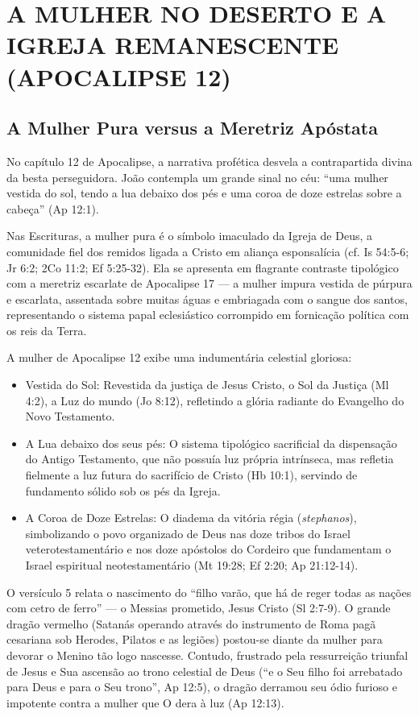 \section{A MULHER NO DESERTO E A IGREJA REMANESCENTE (APOCALIPSE 12)}



\subsection{A Mulher Pura versus a Meretriz Apóstata}


No capítulo 12 de Apocalipse, a narrativa profética desvela a contrapartida divina da besta perseguidora. João contempla um grande sinal no céu: ``uma mulher vestida do sol, tendo a lua debaixo dos pés e uma coroa de doze estrelas sobre a cabeça'' (Ap 12:1).

Nas Escrituras, a mulher pura é o símbolo imaculado da Igreja de Deus, a comunidade fiel dos remidos ligada a Cristo em aliança esponsalícia (cf. Is 54:5-6; Jr 6:2; 2Co 11:2; Ef 5:25-32). Ela se apresenta em flagrante contraste tipológico com a meretriz escarlate de Apocalipse 17 — a mulher impura vestida de púrpura e escarlata, assentada sobre muitas águas e embriagada com o sangue dos santos, representando o sistema papal eclesiástico corrompido em fornicação política com os reis da Terra.

A mulher de Apocalipse 12 exibe uma indumentária celestial gloriosa:
\begin{itemize}
  \item Vestida do Sol: Revestida da justiça de Jesus Cristo, o Sol da Justiça (Ml 4:2), a Luz do mundo (Jo 8:12), refletindo a glória radiante do Evangelho do Novo Testamento.
  \item A Lua debaixo dos seus pés: O sistema tipológico sacrificial da dispensação do Antigo Testamento, que não possuía luz própria intrínseca, mas refletia fielmente a luz futura do sacrifício de Cristo (Hb 10:1), servindo de fundamento sólido sob os pés da Igreja.
  \item A Coroa de Doze Estrelas: O diadema da vitória régia (\textit{stephanos}), simbolizando o povo organizado de Deus nas doze tribos do Israel veterotestamentário e nos doze apóstolos do Cordeiro que fundamentam o Israel espiritual neotestamentário (Mt 19:28; Ef 2:20; Ap 21:12-14).
\end{itemize}


O versículo 5 relata o nascimento do ``filho varão, que há de reger todas as nações com cetro de ferro'' — o Messias prometido, Jesus Cristo (Sl 2:7-9). O grande dragão vermelho (Satanás operando através do instrumento de Roma pagã cesariana sob Herodes, Pilatos e as legiões) postou-se diante da mulher para devorar o Menino tão logo nascesse. Contudo, frustrado pela ressurreição triunfal de Jesus e Sua ascensão ao trono celestial de Deus (``e o Seu filho foi arrebatado para Deus e para o Seu trono'', Ap 12:5), o dragão derramou seu ódio furioso e impotente contra a mulher que O dera à luz (Ap 12:13).



